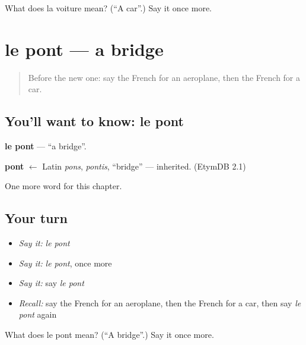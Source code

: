 \begin{tcolorbox}[breakable,colback=teal!4,colframe=teal!35!black,title={Before you move on}]
What does la voiture mean? (\textquotedblleft{}A car\textquotedblright{}.) Say it once more.
\end{tcolorbox}
\section[le pont]{le pont — a bridge}

\label{lesson:FR-C100-pont}



\begin{quote}
Before the new one: say the French for an aeroplane, then the French for a car.
\end{quote}

\subsection*{You'll want to know: le pont}
\textbf{le pont} — \textquotedblleft{}a bridge\textquotedblright{}.

\begin{cousinweb}
\textbf{pont} $\leftarrow$ Latin \emph{pons}, \emph{pontis}, \textquotedblleft{}bridge\textquotedblright{} — inherited. (EtymDB 2.1)
\end{cousinweb}

\begin{grammarlens}[title={What you've built}]
One more word for this chapter.
\end{grammarlens}

\subsection*{Your turn}
\begin{itemize}
\raggedright
  \item \emph{Say it:} \emph{le pont}
  \item \emph{Say it:} \emph{le pont}, once more
  \item \emph{Say it:} say \emph{le pont}
  \item \emph{Recall:} say the French for an aeroplane, then the French for a car, then say \emph{le pont} again
\end{itemize}

\begin{tcolorbox}[breakable,colback=teal!4,colframe=teal!35!black,title={Before you move on}]
What does le pont mean? (\textquotedblleft{}A bridge\textquotedblright{}.) Say it once more.
\end{tcolorbox}
